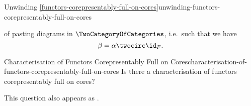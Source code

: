 \begin{remark}{Unwinding \cref{functors-corepresentably-full-on-cores}}{unwinding-functors-corepresentably-full-on-cores}
\begin{webcompile}
        \quad
        \bigequalssign
        \quad
    \end{webcompile}
    of pasting diagrams in $\TwoCategoryOfCategories$, i.e.\ such that we have
    \[
        \beta%
        =%
        \alpha\twocirc\id_{F}.%
    \]%
\end{remark}
\begin{question}{Characterisation of Functors Corepresentably Full on Cores}{characterisation-of-functors-corepresentably-full-on-cores}%
    Is there a characterisation of functors corepresentably full on cores?

    This question also appears as \cite{MO468125}.
\end{question}
